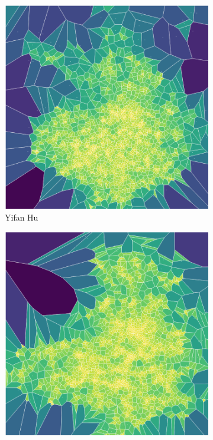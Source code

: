 \begin{figure}[H]
     \centering
    \begin{subfigure}[b]{.49\textwidth}
         \centering \includegraphics[width=\textwidth,angle=90]{figures_c1/area/fill_yfan_aphh.png}
         \caption{Yifan Hu}
         \label{fig:ayfan}
     \end{subfigure}
     \begin{subfigure}[b]{.49\textwidth}
         \centering \includegraphics[width=\textwidth]{figures_c1/area/fill_fa_aphh.png}

\end{subfigure}
\end{figure}
